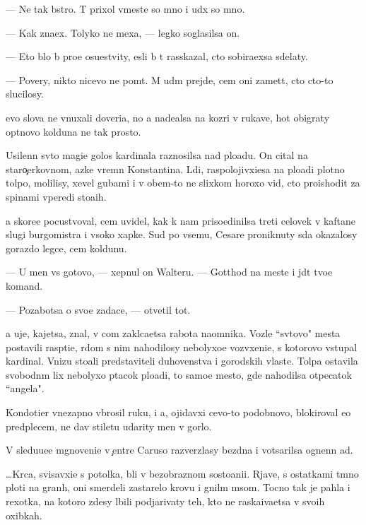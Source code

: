 \documentclass[10pt]{book}
\begin{document}
— Ne tak b{\yi}stro. T{\yi} prixol vmeste so mno{\y} i u{\y}d{\e}x so mno{\y}.

— Kak zna\-{\y}ex. Tolyko ne mexa{\y}, — legko soglasilsa on.

— Eto b{\yi}lo b{\yi} pro{\x}e osu{\x}estvity, {\y}esli b{\yi} t{\yi} rasskazal, cto sobira{\y}exsa sdelaty.

— Povery, nikto nicevo ne po{\y}m{\e}t. M{\yi} u{\y}d{\e}m prejde, cem oni zamet{\ia}t, cto cto-to slucilosy.

{\Y}evo slova ne vnuxali doveri{\y}a, no {\y}a nade{\y}alsa na koz{\yi}ri v rukave, hot{\ia} ob\-igraty op{\yi}tnovo kolduna ne tak prosto.

Usilenn{\yi}{\y} sv{\ia}to{\y} magi{\y}e{\y} golos kardinala raznosilsa nad plo{\x}ad{\y}u. On cital na staro{\c}erkovnom, {\y}az{\yi}ke vrem{\e}n Konstantina. L{\io}di, raspolojivxi{\y}esa na plo{\x}adi plotno{\y} tolpo{\y}, molilisy, xevel{\ia} gubami i v ob{\x}em-to ne slixkom horoxo vid{\ia}, cto proishodit za spinami vperedi sto{\y}a{\x}ih.

{\Y}a skore{\y}e pocustvoval, cem uvidel, kak k nam priso{\y}edinilsa treti{\y} celovek v kaftane slugi burgomistra i v{\yi}soko{\y} xapke. Sud{\ia} po vsemu, Cesare proniknuty s{\io}da okazalosy gorazdo legce, cem koldunu.

— U men{\ia} vs{\e} gotovo, — xepnul on Walteru. — Gotthod na meste i jd{\e}t tvo{\y}e{\y} komand{\yi}.

— Pozabotsa o svo{\y}e{\y} zadace, — otvetil tot.

{\Y}a uje, kajetsa, znal, v com zakl{\io}ca{\y}etsa rabota na\-{\y}om\-ni\-ka. Vozle ``sv{\ia}tovo" mesta postavili rasp{\ia}ti{\y}e, r{\ia}dom s nim nahodilosy nebolyxo{\y}e vozv{\yi}xeni{\y}e, s kotorovo v{\yi}stupal kardinal. Vnizu sto{\y}ali predstaviteli duhovenstva i gorodskih vlaste{\y}. Tolpa ostavila svobodn{\yi}m lix nebolyxo{\y} p{\ia}tacok plo{\x}adi, to samo{\y}e mesto, gde nahodilsa otpecatok ``angela".

Kondotier vnezapno v{\yi}brosil ruku, i {\y}a, ojidavxi{\y} cevo-to podobnovo, bloki\-ro\-val {\y}e{\y}o predplec{\y}em, ne dav stiletu udarity men{\ia} v gorlo.

V sledu{\y}u{\x}e{\y}e mgnoveni{\y}e v {\c}entre Caruso razverzlasy bezdna i votsarilsa ognen\-n{\yi}{\y} ad.



…Kr{\io}c{\y}a, svisavxi{\y}e s potolka, b{\yi}li v bezobraznom sosto{\y}ani{\y}i. Rjav{\yi}{\y}e, s ostatkami t{\e}mno{\y} ploti na gran{\ia}h, oni smerdeli zastarelo{\y} krov{\y}u i gnil{\yi}m m{\ia}som. Tocno tak je pahla i rexotka, na kotoro{\y} zdesy l{\io}bili podjarivaty teh, kto ne raska{\y}iva{\y}etsa v svo{\y}ih oxibkah.
\end{document}
